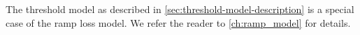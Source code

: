 The threshold model as described in \autoref{sec:threshold-model-description}
is a special case of the ramp loss model.
We refer the reader to \autoref{ch:ramp_model} for details.